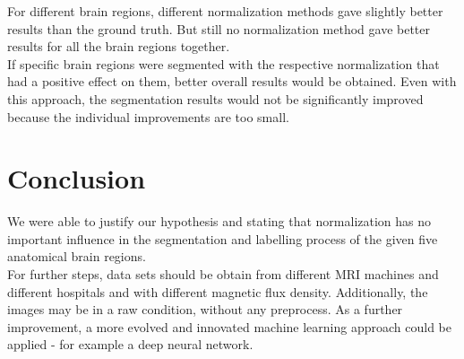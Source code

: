\documentclass[article]{IEEEtran}
\begin{document}
\begin{multicols}{2}
	For different brain regions, different normalization methods gave slightly better results than the ground truth. 
	But still no normalization method gave better results for all the brain regions together.\\	
	
	If specific brain regions were segmented with the respective normalization that had a positive effect on them, better overall results would be obtained. 
	Even with this approach, the segmentation results would not be significantly improved because the individual improvements are too small.



\section{Conclusion}
	We were able to justify our hypothesis and stating that normalization has no important influence in the segmentation and labelling process of the given five anatomical brain regions. \\
	For further steps, data sets should be obtain from different MRI machines and different hospitals and with different magnetic flux density.
	Additionally, the images may be in a raw condition, without any preprocess.
	As a further improvement, a more evolved and innovated machine learning approach could be applied - for example a deep neural network.
	


 

\end{multicols}
\end{document}
